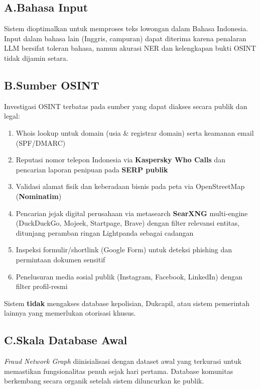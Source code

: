 \documentclass[12pt,a4paper]{article}
\begin{document}
\subsection*{A.\quad Bahasa Input}
Sistem dioptimalkan untuk memproses teks lowongan dalam Bahasa Indonesia. Input dalam bahasa
lain (Inggris, campuran) dapat diterima karena penalaran LLM bersifat toleran
bahasa, namun akurasi NER dan kelengkapan bukti OSINT tidak dijamin setara.

\subsection*{B.\quad Sumber OSINT}
Investigasi OSINT terbatas pada sumber yang dapat diakses secara publik dan legal:
\begin{enumerate}[label=\textbf{\arabic*.}]
  \item Whois lookup untuk domain (usia \& registrar domain) serta keamanan email (SPF/DMARC)
  \item Reputasi nomor telepon Indonesia via \textbf{Kaspersky Who Calls} dan pencarian
        laporan penipuan pada \textbf{SERP publik}
  \item Validasi alamat fisik dan keberadaan bisnis pada peta via OpenStreetMap (\textbf{Nominatim})
  \item Pencarian jejak digital perusahaan via metasearch \textbf{SearXNG} multi-engine
        (DuckDuckGo, Mojeek, Startpage, Brave) dengan filter relevansi entitas, ditunjang
        peramban ringan Lightpanda sebagai cadangan
  \item Inspeksi formulir/shortlink (Google Form) untuk deteksi phishing dan permintaan dokumen sensitif
  \item Penelusuran media sosial publik (Instagram, Facebook, LinkedIn) dengan filter profil-resmi
\end{enumerate}
Sistem \textbf{tidak} mengakses database kepolisian, Dukcapil, atau sistem pemerintah lainnya
yang memerlukan otorisasi khusus.

\subsection*{C.\quad Skala Database Awal}
\textit{Fraud Network Graph} diinisialisasi dengan dataset awal yang terkurasi untuk memastikan
fungsionalitas penuh sejak hari pertama. Database komunitas berkembang secara organik setelah
sistem diluncurkan ke publik.
\end{document}

